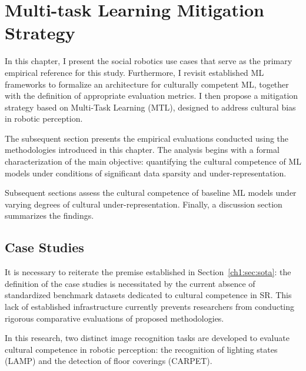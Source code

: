 
\chapter{Multi-task Learning Mitigation Strategy}
\label{ch2}

\ifpdf
    \graphicspath{{Chapter2/Figs/Raster/}{Chapter2/Figs/PDF/}{Chapter2/Figs/}}
\else
    \graphicspath{{Chapter2/Figs/Vector/}{Chapter2/Figs/}}
\fi

In this chapter, I present the social robotics use cases that serve as the primary empirical reference for this study. Furthermore, I revisit established ML frameworks to formalize an architecture for culturally competent ML, together with the definition of appropriate evaluation metrics. I then propose a mitigation strategy based on Multi-Task Learning (MTL), designed to address cultural bias in robotic perception.

The subsequent section presents the empirical evaluations conducted using the methodologies introduced in this chapter. The analysis begins with a formal characterization of the main objective: quantifying the cultural competence of ML models under conditions of significant data sparsity and under-representation.

Subsequent sections assess the cultural competence of baseline ML models under varying degrees of cultural under-representation. Finally, a discussion section summarizes the findings.
%
\section{Case Studies}
\label{ch2:sec:data}

It is necessary to reiterate the premise established in Section~\ref{ch1:sec:sota}: the definition of the case studies is necessitated by the current absence of standardized benchmark datasets dedicated to cultural competence in SR. 
This lack of established infrastructure currently prevents researchers from conducting rigorous comparative evaluations of proposed methodologies.

In this research, two distinct image recognition tasks are developed to evaluate cultural competence in robotic perception: the recognition of lighting states (LAMP) and the detection of floor coverings (CARPET).


